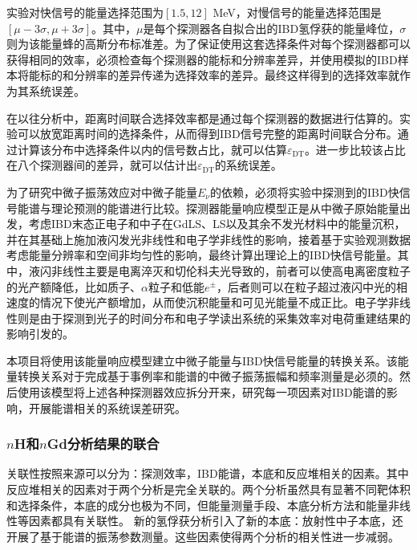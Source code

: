 \documentclass[a4paper,zihao=-4]{article}
\begin{document}
实验对快信号的能量选择范围为$[1.5, 12]$ MeV，对慢信号的能量选择范围是$[\mu-3\sigma, \mu+3\sigma]$。其中，$\mu$是每个探测器各自拟合出的IBD氢俘获的能量峰位，$\sigma$则为该能量蜂的高斯分布标准差。为了保证使用这套选择条件对每个探测器都可以获得相同的效率，必须检查每个探测器的能标和分辨率差异，并使用模拟的IBD样本将能标的和分辨率的差异传递为选择效率的差异。最终这样得到的选择效率就作为其系统误差。

在以往分析中，距离时间联合选择效率都是通过每个探测器的数据进行估算的。实验可以放宽距离时间的选择条件，从而得到IBD信号完整的距离时间联合分布。通过计算该分布中选择条件以内的信号数占比，就可以估算$\varepsilon_{\text{DT}}$。进一步比较该占比在八个探测器间的差异，就可以估计出$\varepsilon_{\text{DT}}$的系统误差。

为了研究中微子振荡效应对中微子能量$E_\nu$的依赖，必须将实验中探测到的IBD快信号能谱与理论预测的能谱进行比较。探测器能量响应模型正是从中微子原始能量出发，考虑IBD末态正电子和中子在GdLS、LS以及其余不发光材料中的能量沉积，并在其基础上施加液闪发光非线性和电子学非线性的影响，接着基于实验观测数据考虑能量分辨率和空间非均匀性的影响，最终计算出理论上的IBD快信号能量。其中，液闪非线性主要是电离淬灭和切伦科夫光导致的，前者可以使高电离密度粒子的光产额降低，比如质子、$\alpha$粒子和低能$e^\pm$，后者则可以在粒子超过液闪中光的相速度的情况下使光产额增加，从而使沉积能量和可见光能量不成正比。电子学非线性则是由于探测到光子的时间分布和电子学读出系统的采集效率对电荷重建结果的影响引发的。

本项目将使用该能量响应模型建立中微子能量与IBD快信号能量的转换关系。该能量转换关系对于完成基于事例率和能谱的中微子振荡振幅和频率测量是必须的。然后使用该模型将上述各种探测器效应拆分开来，研究每一项因素对IBD能谱的影响，开展能谱相关的系统误差研究。


\subsubsection{$n$H和$n$Gd分析结果的联合}\label{sec:nGdnH-combine}

关联性按照来源可以分为：探测效率，IBD能谱，本底和反应堆相关的因素。其中反应堆相关的因素对于两个分析是完全关联的。两个分析虽然具有显著不同靶体积和选择条件，本底的成分也极为不同，但能量测量手段、本底分析方法和能量非线性等因素都具有关联性。 新的氢俘获分析引入了新的本底：放射性中子本底，还开展了基于能谱的振荡参数测量。这些因素使得两个分析的相关性进一步减弱。
\end{document}
